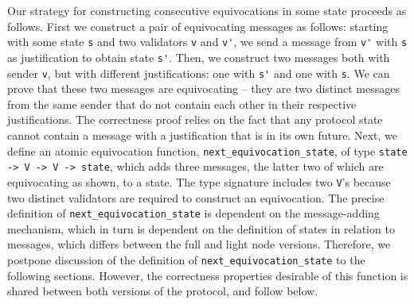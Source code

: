 \documentclass[runningheads]{llncs}
\begin{document}
Our strategy for constructing consecutive equivocations in some state proceeds as follows. First we construct a pair of equivocating messages as follows: starting with some state \verb|s| and two validators \verb|v| and \verb|v'|, we send a message from \verb|v'|  with \verb|s| as justification to obtain state \verb|s'|. Then, we construct two messages both with sender \verb|v|, but with different justifications: one with \verb|s'| and one  with \verb|s|. We can prove that these two messages are equivocating -- they are two distinct messages from the same sender that do not contain each other in their respective justifications. The correctness proof relies on the fact that any protocol state cannot contain a message with a justification that is in its own future. Next, we define an atomic equivocation function, \verb|next_equivocation_state|, of type \verb|state -> V -> V -> state|, which adds three messages, the latter two of which are equivocating as shown, to a state. The type signature includes two \verb|V|'s because two distinct validators are required to construct an equivocation. 
The precise definition of \verb|next_equivocation_state| is dependent on the message-adding mechanism, which in turn is dependent on the definition of states in relation to messages, which differs between the full and light node versions. Therefore, we postpone discussion of the definition of \verb|next_equivocation_state| to the following sections. However, the correctness properties desirable of this function is shared between both versions of the protocol, and follow below. 
\end{document}
